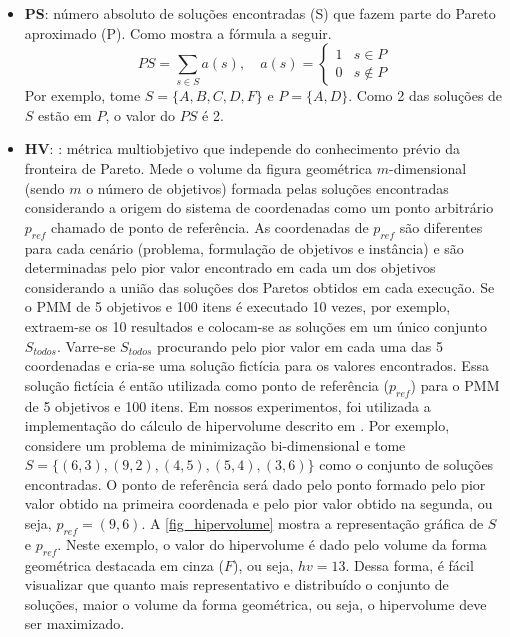 \begin{itemize}
	\item \textbf{\ac{PS}}: número absoluto de soluções encontradas (S) que fazem parte do Pareto aproximado (P). Como mostra a fórmula a seguir.
	\begin{equation}
		PS = \sum\limits_{s \in S} a(s), \quad
		a(s) = 
		\begin{cases} 
			1 & s \in P \\
			0 & s \notin P
		\end{cases}
	\end{equation}
	Por exemplo, tome $S=\{A, B, C, D, F\}$ e $P=\{A,D\}$. Como 2 das soluções de $S$ estão em $P$, o valor do $PS$ é 2.
	\item \textbf{\ac{HV}}: \cite{Bradstreet2012}: métrica multiobjetivo que independe do conhecimento prévio da fronteira de Pareto. Mede o volume da figura geométrica $m$-dimensional (sendo $m$ o número de objetivos) formada pelas soluções encontradas considerando a origem do sistema de coordenadas como um ponto arbitrário $p_{ref}$ chamado de ponto de referência. As coordenadas de $p_{ref}$ são diferentes para cada cenário (problema, formulação de objetivos e instância) e são determinadas pelo pior valor encontrado em cada um dos objetivos considerando a união das soluções dos Paretos obtidos em cada execução. Se o PMM de 5 objetivos e 100 itens é executado 10 vezes, por exemplo, extraem-se os 10 resultados e colocam-se as soluções em um único conjunto $S_{todos}$. Varre-se $S_{todos}$ procurando pelo pior valor em cada uma das 5 coordenadas e cria-se uma solução fictícia para os valores encontrados. Essa solução fictícia é então utilizada como ponto de referência ($p_{ref}$) para o PMM de 5 objetivos e 100 itens. Em nossos experimentos, foi utilizada a implementação do cálculo de hipervolume descrito em .
	Por exemplo, considere um problema de minimização bi-dimensional e tome $S=\{(6,3), (9,2), (4,5), (5,4), (3,6)\}$ como o conjunto de soluções encontradas. O ponto de referência será dado pelo ponto formado pelo pior valor obtido na primeira coordenada e pelo pior valor obtido na segunda, ou seja, $p_{ref}=(9,6)$. A \autoref{fig_hipervolume} mostra a representação gráfica de $S$ e $p_{ref}$. Neste exemplo, o valor do hipervolume é dado pelo volume da forma geométrica destacada em cinza ($F$), ou seja, $hv=13$. Dessa forma, é fácil visualizar que quanto mais representativo e distribuído o conjunto de soluções, maior o volume da forma geométrica, ou seja, o hipervolume deve ser maximizado.
	\begin{figure}[!htbp]

\end{figure}
\end{itemize}
